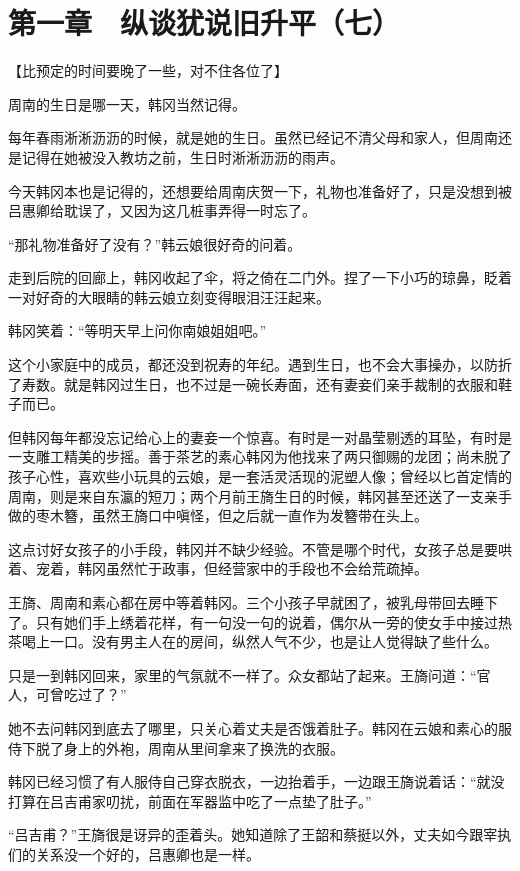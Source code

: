 \section{第一章　纵谈犹说旧升平（七）}

【比预定的时间要晚了一些，对不住各位了】

周南的生日是哪一天，韩冈当然记得。

每年春雨淅淅沥沥的时候，就是她的生日。虽然已经记不清父母和家人，但周南还是记得在她被没入教坊之前，生日时淅淅沥沥的雨声。

今天韩冈本也是记得的，还想要给周南庆贺一下，礼物也准备好了，只是没想到被吕惠卿给耽误了，又因为这几桩事弄得一时忘了。

“那礼物准备好了没有？”韩云娘很好奇的问着。

走到后院的回廊上，韩冈收起了伞，将之倚在二门外。捏了一下小巧的琼鼻，眨着一对好奇的大眼睛的韩云娘立刻变得眼泪汪汪起来。

韩冈笑着：“等明天早上问你南娘姐姐吧。”

这个小家庭中的成员，都还没到祝寿的年纪。遇到生日，也不会大事操办，以防折了寿数。就是韩冈过生日，也不过是一碗长寿面，还有妻妾们亲手裁制的衣服和鞋子而已。

但韩冈每年都没忘记给心上的妻妾一个惊喜。有时是一对晶莹剔透的耳坠，有时是一支雕工精美的步摇。善于茶艺的素心韩冈为他找来了两只御赐的龙团；尚未脱了孩子心性，喜欢些小玩具的云娘，是一套活灵活现的泥塑人像；曾经以匕首定情的周南，则是来自东瀛的短刀；两个月前王旖生日的时候，韩冈甚至还送了一支亲手做的枣木簪，虽然王旖口中嗔怪，但之后就一直作为发簪带在头上。

这点讨好女孩子的小手段，韩冈并不缺少经验。不管是哪个时代，女孩子总是要哄着、宠着，韩冈虽然忙于政事，但经营家中的手段也不会给荒疏掉。

王旖、周南和素心都在房中等着韩冈。三个小孩子早就困了，被乳母带回去睡下了。只有她们手上绣着花样，有一句没一句的说着，偶尔从一旁的使女手中接过热茶喝上一口。没有男主人在的房间，纵然人气不少，也是让人觉得缺了些什么。

只是一到韩冈回来，家里的气氛就不一样了。众女都站了起来。王旖问道：“官人，可曾吃过了？”

她不去问韩冈到底去了哪里，只关心着丈夫是否饿着肚子。韩冈在云娘和素心的服侍下脱了身上的外袍，周南从里间拿来了换洗的衣服。

韩冈已经习惯了有人服侍自己穿衣脱衣，一边抬着手，一边跟王旖说着话：“就没打算在吕吉甫家叨扰，前面在军器监中吃了一点垫了肚子。”

“吕吉甫？”王旖很是讶异的歪着头。她知道除了王韶和蔡挺以外，丈夫如今跟宰执们的关系没一个好的，吕惠卿也是一样。

